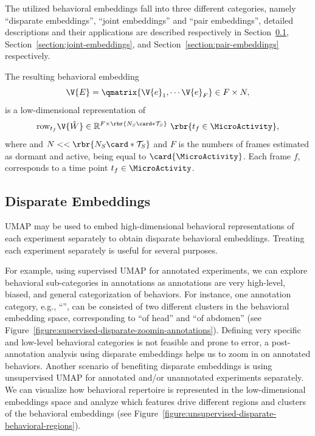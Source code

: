 The utilized behavioral embeddings fall into three different categories, namely ``disparate embeddings'', ``joint embeddings'' and ``pair embeddings'', detailed descriptions and their applications are described respectively in  Section~\ref{section:disparate-embeddings}, Section~\ref{section:joint-embeddings}, and  Section~\ref{section:pair-embeddings} respectively.

The resulting behavioral embedding
\begin{equation}
	\V{E}=\qmatrix{\V{e}_1, \cdots \V{e}_{F}} \in F \times N,
\end{equation}
is a low-dimensional representation of
\begin{equation}
	\mathrm{row}_{t_f} \V{\hat{W}} \in \mathbb{R}^{F \times \rbr{ N_S\card*{\mathcal{T}_S}}} \ \rbr{t_f \in \MicroActivity},
\end{equation}
where and $N << \rbr{ N_S\card*{\mathcal{T}_S}}$ and $F$ is the numbers of frames estimated as dormant and active, being equal to $\card{\MicroActivity}$.
Each frame $f$, corresponds to a time point $t_f\in \MicroActivity$.

\subsection{Disparate Embeddings}\label{section:disparate-embeddings}
UMAP may be used to embed high-dimensional behavioral representations of each experiment separately to obtain disparate behavioral embeddings. Treating each experiment separately is useful for several purposes.

For example, using supervised UMAP for annotated experiments, we can explore behavioral sub-categories in annotations as annotations are very high-level, biased, and general categorization of behaviors. For instance, one annotation category, e.g., ``\Grooming'', can be consisted of two different clusters in the behavioral embedding space, corresponding to ``\Grooming of head'' and ``\Grooming of abdomen'' (see Figure~\ref{figure:supervised-disparate-zoomin-annotations}).
Defining very specific and low-level behavioral categories is not feasible and prone to error, a post-annotation analysis using disparate embeddings helps us to zoom in on annotated behaviors.
Another scenario of benefiting disparate embeddings is using unsupervised UMAP for annotated and/or unannotated experiments separately.
We can visualize how behavioral repertoire is represented in the low-dimensional embeddings space and analyze which features drive different regions and clusters of the behavioral embeddings (see Figure~\ref{figure:unsupervised-disparate-behavioral-regions}).

